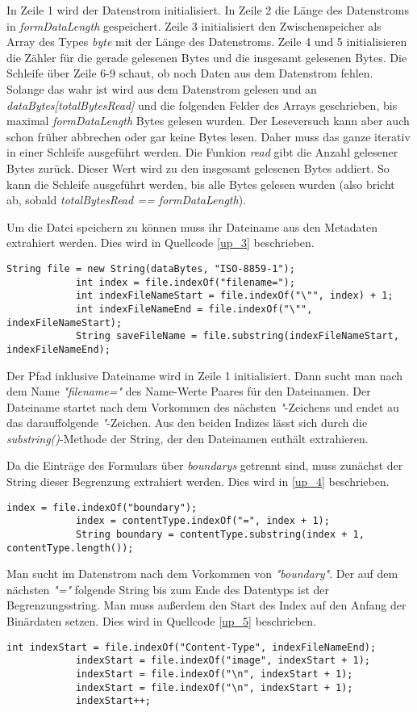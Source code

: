 In Zeile 1 wird der Datenstrom initialisiert. In Zeile 2 die Länge des Datenstroms in \textit{formDataLength} gespeichert. Zeile 3 initialisiert den Zwischenspeicher als Array des Types \textit{byte} mit der Länge des Datenstroms. Zeile 4 und 5 initialisieren die Zähler für die gerade gelesenen Bytes und die insgesamt gelesenen Bytes. Die Schleife über Zeile 6-9 schaut, ob noch Daten aus dem Datenstrom fehlen. Solange das wahr ist wird aus dem Datenstrom gelesen und an \textit{dataBytes[totalBytesRead]} und die folgenden Felder des Arrays geschrieben, bis maximal \textit{formDataLength} Bytes gelesen wurden. Der Leseversuch kann aber auch schon früher abbrechen oder gar keine Bytes lesen. Daher muss das ganze iterativ in einer Schleife ausgeführt werden. Die Funkion \textit{read} gibt die Anzahl gelesener Bytes zurück. Dieser Wert wird zu den insgesamt gelesenen Bytes addiert. So kann die Schleife ausgeführt werden, bis alle Bytes gelesen wurden (also bricht ab, sobald \textit{totalBytesRead == formDataLength}).

Um die Datei speichern zu können muss ihr Dateiname aus den Metadaten extrahiert werden. Dies wird in Quellcode \ref{up_3} beschrieben.
\begin{lstlisting}[caption={Lesen des Dateinamen aus den Metadaten},label=up_3]
            String file = new String(dataBytes, "ISO-8859-1");
			int index = file.indexOf("filename=");
			int indexFileNameStart = file.indexOf("\"", index) + 1;
			int indexFileNameEnd = file.indexOf("\"", indexFileNameStart);
			String saveFileName = file.substring(indexFileNameStart, indexFileNameEnd);
\end{lstlisting}
Der Pfad inklusive Dateiname wird in Zeile 1 initialisiert. Dann sucht man nach dem Name \textit{"filename="} des Name-Werte Paares für den Dateinamen. Der Dateiname startet nach dem Vorkommen des nächsten \textit{"}-Zeichens und endet au das darauffolgende \textit{"}-Zeichen. Aus den beiden Indizes lässt sich durch die \textit{substring()}-Methode der String, der den Dateinamen enthält extrahieren.

Da die Einträge des Formulars über \textit{boundarys} getrennt sind, muss zunächst der String dieser Begrenzung extrahiert werden. Dies wird in \ref{up_4} beschrieben.
\begin{lstlisting}[caption={Extrahieren des boundary-Strings},label=up_4]
            index = file.indexOf("boundary");
			index = contentType.indexOf("=", index + 1);
			String boundary = contentType.substring(index + 1, contentType.length());
\end{lstlisting}
Man sucht im Datenstrom nach dem Vorkommen von \textit{"boundary"}. Der auf dem nächsten \textit{"="} folgende String bis zum Ende des Datentyps ist der Begrenzungsstring.
Man muss außerdem den Start des Index auf den Anfang der Binärdaten setzen. Dies wird in Quellcode \ref{up_5} beschrieben.
\begin{lstlisting}[caption={Navigiere zum Start der Binärdaten},label=up_5]
			int indexStart = file.indexOf("Content-Type", indexFileNameEnd);
			indexStart = file.indexOf("image", indexStart + 1);
			indexStart = file.indexOf("\n", indexStart + 1);
			indexStart = file.indexOf("\n", indexStart + 1);
			indexStart++;
\end{lstlisting}

